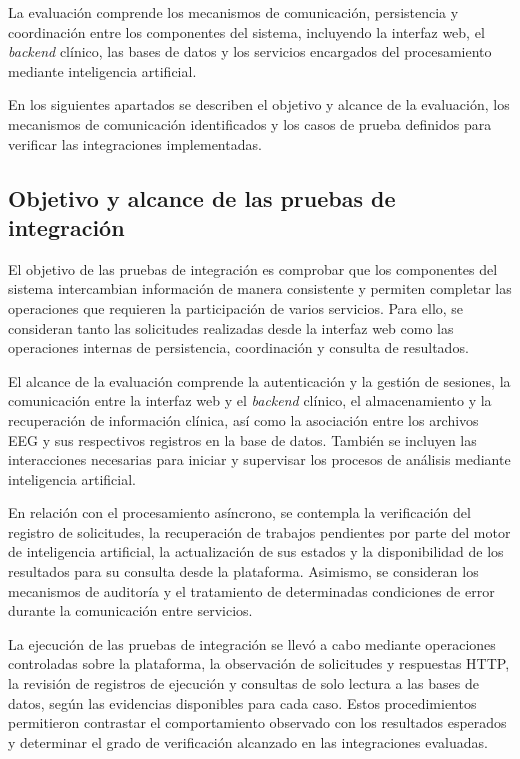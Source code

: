 La evaluación comprende los mecanismos de comunicación, persistencia y coordinación entre los componentes del sistema, incluyendo la interfaz web, el \textit{backend} clínico, las bases de datos y los servicios encargados del procesamiento mediante inteligencia artificial.

En los siguientes apartados se describen el objetivo y alcance de la evaluación, los mecanismos de comunicación identificados y los casos de prueba definidos para verificar las integraciones implementadas.


\subsection{Objetivo y alcance de las pruebas de integración}

\label{subsec:objetivo_pruebas_integracion}

El objetivo de las pruebas de integración es comprobar que los componentes del sistema intercambian información de manera consistente y permiten completar las operaciones que requieren la participación de varios servicios. Para ello, se consideran tanto las solicitudes realizadas desde la interfaz web como las operaciones internas de persistencia, coordinación y consulta de resultados.

El alcance de la evaluación comprende la autenticación y la gestión de sesiones, la comunicación entre la interfaz web y el \textit{backend} clínico, el almacenamiento y la recuperación de información clínica, así como la asociación entre los archivos EEG y sus respectivos registros en la base de datos. También se incluyen las interacciones necesarias para iniciar y supervisar los procesos de análisis mediante inteligencia artificial.

En relación con el procesamiento asíncrono, se contempla la verificación del registro de solicitudes, la recuperación de trabajos pendientes por parte del motor de inteligencia artificial, la actualización de sus estados y la disponibilidad de los resultados para su consulta desde la plataforma. Asimismo, se consideran los mecanismos de auditoría y el tratamiento de determinadas condiciones de error durante la comunicación entre servicios.


La ejecución de las pruebas de integración se llevó a cabo mediante operaciones controladas sobre la plataforma, la observación de solicitudes y respuestas HTTP, la revisión de registros de ejecución y consultas de solo lectura a las bases de datos, según las evidencias disponibles para cada caso. Estos procedimientos permitieron contrastar el comportamiento observado con los resultados esperados y determinar el grado de verificación alcanzado en las integraciones evaluadas.


